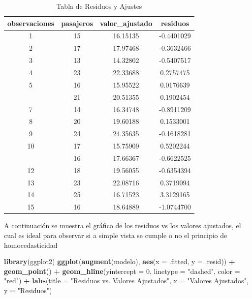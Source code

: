 \documentclass[
]{book}
\newenvironment{Shaded}{\begin{snugshade}}{\end{snugshade}}
\newcommand{\AttributeTok}[1]{\textcolor[rgb]{0.13,0.29,0.53}{#1}}
\newcommand{\DecValTok}[1]{\textcolor[rgb]{0.00,0.00,0.81}{#1}}
\newcommand{\FunctionTok}[1]{\textcolor[rgb]{0.13,0.29,0.53}{\textbf{#1}}}
\newcommand{\NormalTok}[1]{#1}
\newcommand{\SpecialCharTok}[1]{\textcolor[rgb]{0.81,0.36,0.00}{\textbf{#1}}}
\newcommand{\StringTok}[1]{\textcolor[rgb]{0.31,0.60,0.02}{#1}}
\begin{document}
\begin{table}

\caption{\label{tab:res}Tabla de Residuos y Ajustes}
\centering
\begin{tabular}[t]{cccc}
\toprule
observaciones & pasajeros & valor\_ajustado & residuos\\
\midrule
1 & 15 & 16.15135 & -0.4401029\\
2 & 17 & 17.97468 & -0.3632466\\
3 & 13 & 14.32802 & -0.5407517\\
4 & 23 & 22.33688 & 0.2757475\\
5 & 16 & 15.95522 & 0.0176639\\
\addlinespace
6 & 21 & 20.51355 & 0.1902454\\
7 & 14 & 16.34748 & -0.8911209\\
8 & 20 & 19.60188 & 0.1533001\\
9 & 24 & 24.35635 & -0.1618281\\
10 & 17 & 15.75909 & 0.5202244\\
\addlinespace
11 & 16 & 17.66367 & -0.6622525\\
12 & 18 & 19.56055 & -0.6354394\\
13 & 23 & 22.08716 & 0.3719094\\
14 & 25 & 16.71523 & 3.3129165\\
15 & 16 & 18.64889 & -1.0744700\\
\bottomrule
\end{tabular}
\end{table}

A continuación se muestra el gráfico de los residuos vs los valores ajustados, el cual es ideal para observar si a simple vista se cumple o no el principio de homocedasticidad

\begin{Shaded}
\begin{Highlighting}[]
\FunctionTok{library}\NormalTok{(ggplot2)}
\FunctionTok{ggplot}\NormalTok{(}\FunctionTok{augment}\NormalTok{(modelo), }\FunctionTok{aes}\NormalTok{(}\AttributeTok{x =}\NormalTok{ .fitted, }\AttributeTok{y =}\NormalTok{ .resid)) }\SpecialCharTok{+}
  \FunctionTok{geom\_point}\NormalTok{() }\SpecialCharTok{+}
  \FunctionTok{geom\_hline}\NormalTok{(}\AttributeTok{yintercept =} \DecValTok{0}\NormalTok{, }\AttributeTok{linetype =} \StringTok{"dashed"}\NormalTok{, }\AttributeTok{color =} \StringTok{"red"}\NormalTok{) }\SpecialCharTok{+}
  \FunctionTok{labs}\NormalTok{(}\AttributeTok{title =} \StringTok{"Residuos vs. Valores Ajustados"}\NormalTok{,}
       \AttributeTok{x =} \StringTok{"Valores Ajustados"}\NormalTok{,}
       \AttributeTok{y =} \StringTok{"Residuos"}\NormalTok{)}
\end{Highlighting}
\end{Shaded}
\end{document}
